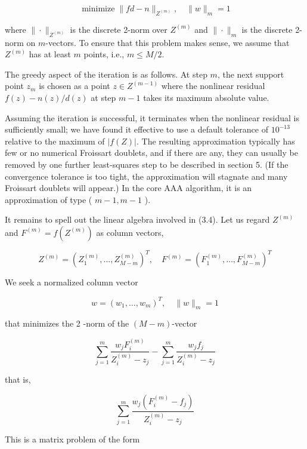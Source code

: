 \documentclass[11pt]{article}
\theoremstyle{definition}
\begin{document}
    
    \begin{equation*}
    \operatorname{minimize}\|f d-n\|_{Z^{(m)}}, \quad\|w\|_{m}=1 \tag{3.4}
    \end{equation*}
    
    
    where $\|\cdot\|_{Z^{(m)}}$ is the discrete 2-norm over $Z^{(m)}$ and $\|\cdot\|_{m}$ is the discrete 2-norm on $m$-vectors. To ensure that this problem makes sense, we assume that $Z^{(m)}$ has at least $m$ points, i.e., $m \leq M / 2$.
    
    The greedy aspect of the iteration is as follows. At step $m$, the next support point $z_{m}$ is chosen as a point $z \in Z^{(m-1)}$ where the nonlinear residual $f(z)-n(z) / d(z)$ at step $m-1$ takes its maximum absolute value.
    
    Assuming the iteration is successful, it terminates when the nonlinear residual is sufficiently small; we have found it effective to use a default tolerance of $10^{-13}$ relative to the maximum of $|f(Z)|$. The resulting approximation typically has few or no numerical Froissart doublets, and if there are any, they can usually be removed by one further least-squares step to be described in section 5. (If the convergence tolerance is too tight, the approximation will stagnate and many Froissart doublets will appear.) In the core AAA algorithm, it is an approximation of type ( $m-1, m-1$ ).
    
    It remains to spell out the linear algebra involved in (3.4). Let us regard $Z^{(m)}$ and $F^{(m)}=f\left(Z^{(m)}\right)$ as column vectors,
    
    $$
    Z^{(m)}=\left(Z_{1}^{(m)}, \ldots, Z_{M-m}^{(m)}\right)^{T}, \quad F^{(m)}=\left(F_{1}^{(m)}, \ldots, F_{M-m}^{(m)}\right)^{T}
    $$
    
    We seek a normalized column vector
    
    $$
    w=\left(w_{1}, \ldots, w_{m}\right)^{T}, \quad\|w\|_{m}=1
    $$
    
    that minimizes the 2 -norm of the $(M-m)$-vector
    
    $$
    \sum_{j=1}^{m} \frac{w_{j} F_{i}^{(m)}}{Z_{i}^{(m)}-z_{j}}-\sum_{j=1}^{m} \frac{w_{j} f_{j}}{Z_{i}^{(m)}-z_{j}}
    $$
    
    that is,
    
    $$
    \sum_{j=1}^{m} \frac{w_{j}\left(F_{i}^{(m)}-f_{j}\right)}{Z_{i}^{(m)}-z_{j}}
    $$
    
    This is a matrix problem of the form
    
\end{document}
